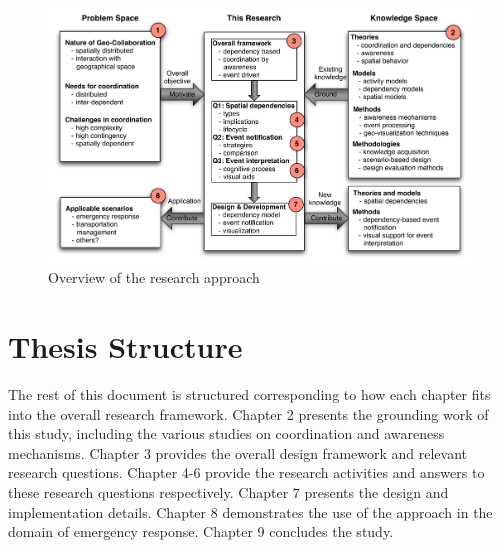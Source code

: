 \begin{figure}[htbp] %
   \centering
   \includegraphics[width=5.8in]{research_overview.pdf} 
   \caption{Overview of the research approach}
   \label{fig:research_overview}
\end{figure}


\section{Thesis Structure} %
\label{sec:thesis_structure}
The rest of this document is structured corresponding to how each chapter fits into the overall research framework. Chapter 2 presents the grounding work of this study, including the various studies on coordination and awareness mechanisms. Chapter 3 provides the overall design framework and relevant research questions. Chapter 4-6 provide the research activities and answers to these research questions respectively. Chapter 7 presents the design and implementation details. Chapter 8 demonstrates the use of the approach in the domain of emergency response. Chapter 9 concludes the study.

